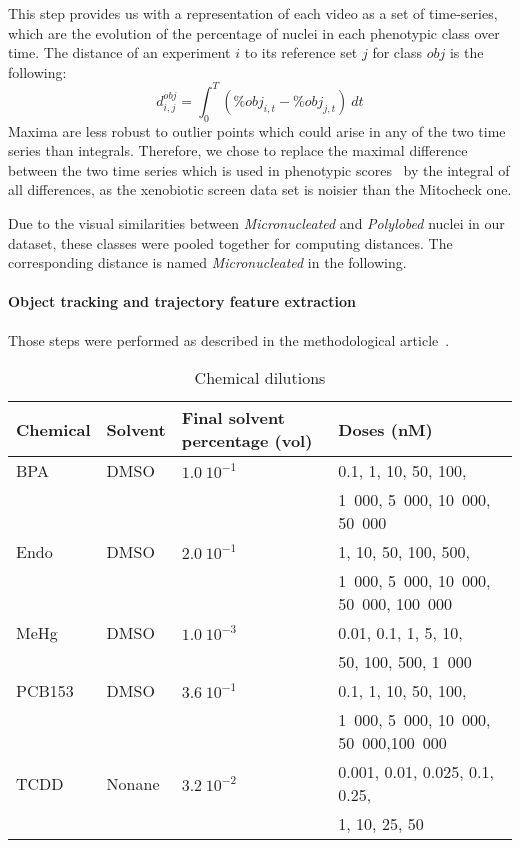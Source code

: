 This step provides us with a representation of each video as a set of time-series, which are the evolution of the percentage of nuclei in each phenotypic class over time. The distance of an experiment $i$ to its reference set $j$ for class $obj$ is the following:
\[
d^{obj}_{i,j} = \int_0^{T} (\% obj_{i,t} - \% obj_{j,t} )~dt
\]
Maxima are less robust to outlier points which could arise in any of the two time series than integrals. Therefore, we chose to replace the maximal difference between the two time series which is used in phenotypic scores~\cite{Walter2010} by the integral of all differences, as the xenobiotic screen data set is noisier than the Mitocheck one. 

Due to the visual similarities between \textit{Micronucleated} and \textit{Polylobed} nuclei in our dataset, these classes were pooled together for computing distances. The corresponding distance is named \textit{Micronucleated} in the following.

\paragraph{Object tracking and trajectory feature extraction} Those steps were performed as described in the methodological article~\cite{motiw}.


\begin{table}[!ht]
\caption{Chemical dilutions}
\vspace{0.4cm}
\label{dilutions}
\begin{tabular}{|l|l|l|l|}
\hline
Chemical & Solvent & \parbox{3cm}{Final solvent percentage (vol)} & Doses (nM) \\
\hline
BPA & DMSO & $1.0~10^{-1} $ &0.1, 1, 10, 50, 100, \\
&&&1~000, 5~000, 10~000, 50~000\\
\hline
Endo & DMSO & $2.0~10^{-1} $ &1, 10, 50, 100, 500,\\
&&& 1~000, 5~000, 10~000, 50~000, 100~000\\
\hline
MeHg & DMSO & $1.0~10^{-3} $ & 0.01, 0.1, 1, 5, 10,\\
&&& 50, 100, 500, 1~000\\
\hline
PCB153 & DMSO & $3.6~10^{-1} $ &0.1, 1, 10, 50, 100,\\
&&& 1~000, 5~000, 10~000, 50~000,100~000\\
\hline
TCDD & Nonane &$3.2~10^{-2} $ & 0.001, 0.01,	0.025, 0.1, 0.25,\\
&&& 1, 10, 25, 50\\
\hline
\end{tabular}
\end{table}
